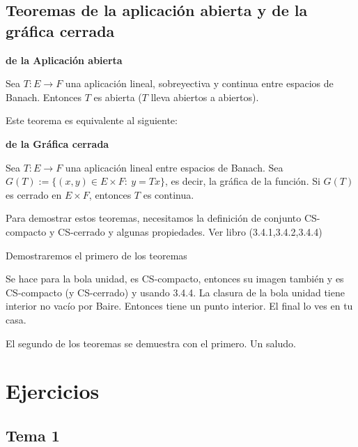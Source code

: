 \documentclass[openany]{book}
\begin{document}
\section{Teoremas de la aplicación abierta y de la gráfica cerrada}

\begin{theorem}
    \textbf{de la Aplicación abierta}

    Sea $ T: E \to F$ una aplicación lineal, sobreyectiva y continua entre espacios de Banach. Entonces $ T$ es abierta ($ T$ lleva abiertos a abiertos).
\end{theorem}

Este teorema es equivalente al siguiente:

\begin{theorem}
    \textbf{de la Gráfica cerrada}

    Sea $ T : E\to F$ una aplicación lineal entre espacios de Banach. Sea $ G(T):= \{(x,y) \in E \times F:\ y = Tx\}$, es decir, la gráfica de la función. Si $ G(T)$ es cerrado en $ E \times F$, entonces $ T$ es continua.
\end{theorem}

Para demostrar estos teoremas, necesitamos la definición de conjunto CS-compacto y CS-cerrado y algunas propiedades. Ver libro (3.4.1,3.4.2,3.4.4)

Demostraremos el primero de los teoremas

\begin{demonstration}
    Se hace para la bola unidad, es CS-compacto, entonces su imagen también y es CS-compacto (y CS-cerrado) y usando 3.4.4. La clasura de la bola unidad tiene interior no vacío por Baire. Entonces tiene un punto interior. El final lo ves en tu casa.
\end{demonstration}

El segundo de los teoremas se demuestra con el primero. Un saludo.

\chapter{Ejercicios}

\section{Tema 1}

\setcounter{ex}{3}
\end{document}
